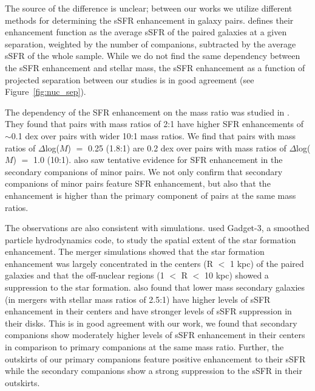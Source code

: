 \documentclass[iop,revtex4,twocolumn,apj,numberedappendix,appendixfloats]{emulateapj}
\begin{document}
The source of the difference is unclear; between our works we utilize different methods for determining the sSFR enhancement in galaxy pairs. \citet{Li:2008} defines their enhancement function as the average sSFR of the paired galaxies at a given separation, weighted by the number of companions, subtracted by the average sSFR of the whole sample. While we do not find the same dependency between the sSFR enhancement and stellar mass, the sSFR enhancement as a function of projected separation between our studies is in good agreement (see Figure~\ref{fig:nuc_sep}).

The dependency of the SFR enhancement on the mass ratio was studied in \citet{Ellison:2008}. They found that pairs with mass ratios of 2:1 have higher SFR enhancements of $\sim$0.1 dex over pairs with wider 10:1 mass ratios. We find that pairs with mass ratios of $\Delta$log($M$) $=$ 0.25 (1.8:1) are 0.2 dex over pairs with mass ratios of $\Delta$log($M$) $=$ 1.0 (10:1). \citet{Ellison:2008} also saw tentative evidence for SFR enhancement in the secondary companions of minor pairs. We not only confirm that secondary companions of minor pairs feature SFR enhancement, but also that the enhancement is higher than the primary component of pairs at the same mass ratios. 

The observations are also consistent with simulations. \citet{Moreno:2015} used {\sc Gadget}-3, a smoothed particle hydrodynamics code, to study the spatial extent of the star formation enhancement. The merger simulations showed that the star formation enhancement was largely concentrated in the centers (R $<$ 1 kpc) of the paired galaxies and that the off-nuclear regions (1 $<$ R $<$ 10 kpc) showed a suppression to the star formation. \citet{Moreno:2015} also found that lower mass secondary galaxies (in mergers with stellar mass ratios of 2.5:1) have higher levels of sSFR enhancement in their centers and have stronger levels of sSFR suppression in their disks. This is in good agreement with our work, we found that secondary companions show moderately higher levels of sSFR enhancement in their centers in comparison to primary companions at the same mass ratio. Further, the outskirts of our primary companions feature positive enhancement to their sSFR while the secondary companions show a strong suppression to the sSFR in their outskirts. 
\end{document}
